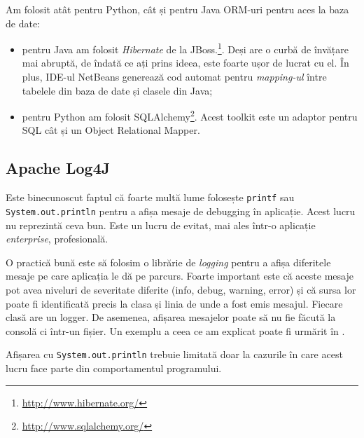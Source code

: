 Am folosit atât pentru Python, cât și pentru Java ORM-uri pentru aces la baza de date:
\begin{itemize}
\item pentru Java am folosit \textit{Hibernate} de la JBoss.\footnote{\url{http://www.hibernate.org/}}. Deși are o curbă de învățare mai abruptă, de îndată ce ați prins ideea, este foarte ușor de lucrat cu el. În plus, IDE-ul NetBeans generează cod automat pentru \textit{mapping-ul} între tabelele din baza de date și clasele din Java;

\item pentru Python am folosit SQLAlchemy\footnote{\url{http://www.sqlalchemy.org/}}. Acest toolkit este un adaptor pentru SQL cât și un Object Relational Mapper.

\end{itemize}


\subsection{Apache Log4J}

Este binecunoscut faptul că foarte multă lume folosește \texttt{printf} sau \texttt{System.out.println} pentru a afișa mesaje de debugging în aplicație. Acest lucru nu reprezintă ceva bun. Este un lucru de evitat, mai ales într-o aplicație \textit{enterprise}, profesională.

O practică bună este să folosim o librărie de \textit{logging} pentru a afișa diferitele mesaje pe care aplicația le dă pe parcurs. Foarte important este că aceste mesaje pot avea niveluri de severitate diferite (info, debug, warning, error) și că sursa lor poate fi identificată precis la clasa și linia de unde a fost emis mesajul. Fiecare clasă are un logger. De asemenea, afișarea mesajelor poate să nu fie făcută la consolă ci într-un fișier. Un exemplu a ceea ce am explicat poate fi urmărit în .


\lstset{language=make}
\lstset{caption=Exemplu de logging realizat de Apache Log4j,  label=lst:logging}


Afișarea cu \texttt{System.out.println} trebuie limitată doar la cazurile în care acest lucru face parte din comportamentul programului.























